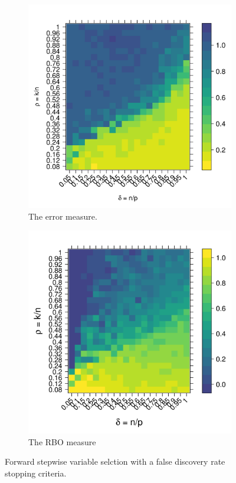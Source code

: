 \documentclass[11pt]{article}
\begin{document}
\begin{figure}[tbhp] 
  \begin{subfigure}[t]{0.5\linewidth}
    \centering
    \includegraphics[totalheight=6cm]{./figs/error_Stodden_FDR.png}
    \caption{The error measure.}
    \label{figure:error_Stodden_FDR.png}
  \end{subfigure} 
  \begin{subfigure}[t]{0.5\linewidth}
    \centering
    \includegraphics[totalheight=6cm]{./figs/rbo_Stodden_FDR.png}
    \caption{The RBO measure}
    \label{figure:rbo_Stodden_FDR.png}
  \end{subfigure} 
  \caption{Forward stepwise variable selction with a false discovery rate stopping criteria.}
  \label{figure:error_and_rbo_Stodden_FDR.png}
\end{figure}
\end{document}
